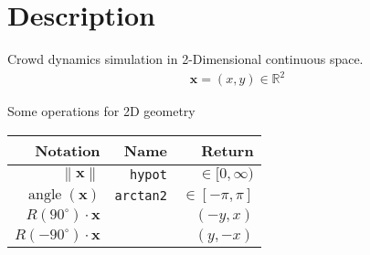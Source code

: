 \section{Description}
Crowd dynamics simulation in 2-Dimensional continuous space.
\begin{align}
\mathbf{x} = (x, y) \in \mathbb{R}^{2}
\end{align}

Some operations for 2D geometry
\begin{table}[H]
\begin{tabularx}{1.0\linewidth}{ R R R }
Notation & Name & Return \\
\hline
\hline
$ \left\| \mathbf{x} \right\| $      & \texttt{hypot} & $ \in [0, \infty) $ \\
$ \operatorname{angle}(\mathbf{x}) $ & \texttt{arctan2} & $ \in [-\pi, \pi] $ \\
$ R(90^{\circ}) \cdot \mathbf{x} $   &  & $ (-y, x) $ \\
$ R(-90^{\circ}) \cdot \mathbf{x} $  &  & $ (y, -x) $ \\
\end{tabularx}
\end{table}

